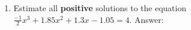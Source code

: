 \documentclass[12pt]{article}
\begin{document}
\begin{enumerate}
\begin{enumerate}
\item Estimate all {\bf{positive}} solutions to the equation\\
 $\frac{-1}{2}x^3+1.85x^2+1.3x-1.05 =4.$
\hfill Answer:\underline{\hspace{2in}}
\end{enumerate}
\end{enumerate}
\end{document}
